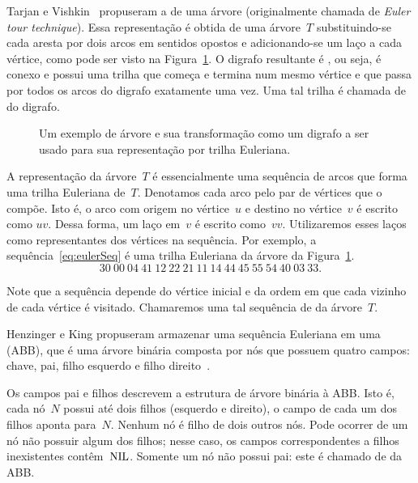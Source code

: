 Tarjan e Vishkin~\cite{tarjan1985} propuseram a  de uma árvore (originalmente chamada de \textit{Euler tour technique}).
Essa representação é obtida de uma árvore~$T$ substituindo-se cada aresta por dois arcos em sentidos opostos e adicionando-se um laço a cada vértice, como pode ser visto na Figura~\ref{fig:exemploSeqEuler}. O digrafo resultante é , ou seja, é conexo e possui uma trilha que começa e termina num mesmo vértice e que passa por todos os arcos do digrafo exatamente uma vez. Uma tal trilha é chamada de  do digrafo.


\begin{figure}[htb]
\centering


\caption{Um exemplo de árvore e sua transformação como um digrafo a ser usado para sua representação por trilha Euleriana.}
\label{fig:exemploSeqEuler}
\end{figure}

A representação da árvore~$T$ é essencialmente uma sequência de arcos que forma uma trilha Euleriana de~$T$.
Denotamos cada arco pelo par de vértices que o compõe.
Isto é, o arco com origem no vértice~$u$ e destino no vértice~$v$ é escrito como $uv$.
Dessa forma, um laço em~$v$ é escrito como~$vv$.
Utilizaremos esses laços como representantes dos vértices na sequência. 
Por exemplo, a sequência~\eqref{eq:eulerSeq} é uma trilha Euleriana da árvore da Figura~\ref{fig:exemploSeqEuler}.
\begin{equation}
30~00~04~41~12~22~21~11~14~44~45~55~54~40~03~33.\label{eq:eulerSeq}  
\end{equation}

Note que a sequência depende do vértice inicial e da ordem em que cada vizinho de cada vértice é visitado. Chamaremos uma tal sequência de  da árvore~$T$.

Henzinger e King \cite{HenzingerKing} propuseram armazenar uma sequência Euleriana em uma  (ABB), que é uma árvore binária composta por nós que possuem  quatro campos: chave, pai, filho esquerdo e filho direito~\cite{CLRS}.

Os campos pai e filhos descrevem a estrutura de árvore binária à ABB. Isto é, cada nó~$N$ possui até dois filhos (esquerdo e direito), o campo  de cada um dos filhos aponta para~$N$. Nenhum nó é filho de dois outros nós. Pode ocorrer de um nó não possuir algum dos filhos; nesse caso, os campos correspondentes a filhos inexistentes contêm~$\text{NIL}$. Somente um nó não possui pai: este é chamado de  da ABB.

